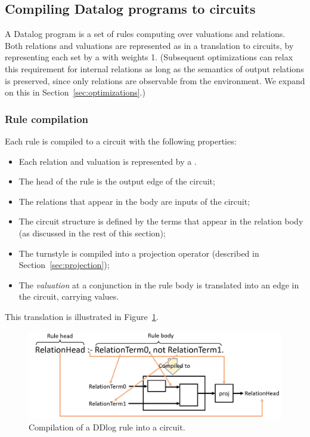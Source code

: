 \subsection{Compiling Datalog programs to circuits}

A Datalog program is a set of rules computing over valuations and relations.
Both relations and valuations are represented as \zrs in a translation to circuits,
by representing each set by a \zr with weights 1.  (Subsequent optimizations can
relax this requirement for internal relations as long as the semantics
of output relations is preserved, since only 
relations are observable from the environment.  We expand on this
in Section~\ref{sec:optimizations}.)

\subsubsection{Rule compilation}

Each rule is compiled to a circuit with the following properties:

\begin{itemize}
    \item Each relation and valuation is represented by a \zr.
    \item The head of the rule is the output edge of the circuit;
    \item The relations that appear in the body are inputs of the circuit;
    \item The circuit structure is defined by the terms that appear
    in the relation body (as discussed in the rest of this section);
    \item The turnstyle is compiled into a projection operator (described in
    Section~\ref{sec:projection});
    \item The \emph{valuation} at a conjunction in the rule body
    is translated into an edge in the circuit, carrying \zr values.
\end{itemize}

This translation is illustrated in Figure~\ref{fig:compilation}.

\begin{figure}[h]
    \center
    \includegraphics[width=\columnwidth,clip=true]{compilation.png}
    \caption{Compilation of a DDlog rule into a circuit.\label{fig:compilation}}
\end{figure}

